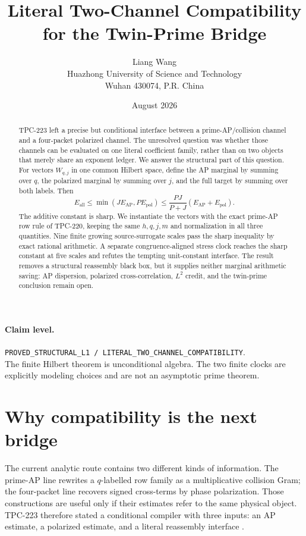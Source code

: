 \documentclass[11pt]{article}
\title{Literal Two-Channel Compatibility for the Twin-Prime Bridge}
\author{Liang Wang\\
  Huazhong University of Science and Technology\\
  Wuhan 430074, P.R. China}
\date{August 2026}
\theoremstyle{remark}
\newcommand{\Eall}{E_{\mathrm{all}}}
\newcommand{\Eap}{E_{\mathrm{AP}}}
\newcommand{\Epol}{E_{\mathrm{pol}}}
\begin{document}
\maketitle

\begin{abstract}
TPC-223 left a precise but conditional interface between a prime-AP/collision
channel and a four-packet polarized channel.  The unresolved question was
whether those channels can be evaluated on one literal coefficient family,
rather than on two objects that merely share an exponent ledger.  We answer
the structural part of this question.  For vectors $W_{q,j}$ in one common
Hilbert space, define the AP marginal by summing over $q$, the polarized
marginal by summing over $j$, and the full target by summing over both labels.
Then
\[
 \Eall\leq \min(J\Eap,P\Epol)
 \leq \frac{PJ}{P+J}(\Eap+\Epol).
\]
The additive constant is sharp.  We instantiate the vectors with the exact
prime-AP row rule of TPC-220, keeping the same $h,q,j,m$ and normalization in
all three quantities.  Nine finite growing source-surrogate scales pass the
sharp inequality by exact rational arithmetic.  A separate congruence-aligned
stress clock reaches the sharp constant at five scales and refutes the tempting
unit-constant interface.  The result removes a structural reassembly black
box, but it supplies neither marginal arithmetic saving: AP dispersion,
polarized cross-correlation, $L^2$ credit, and the twin-prime conclusion remain
open.
\end{abstract}

\paragraph{Claim level.}
\texttt{PROVED\_STRUCTURAL\_L1 / LITERAL\_TWO\_CHANNEL\_COMPATIBILITY}.\\
The finite Hilbert theorem is unconditional algebra.  The two finite clocks
are explicitly modeling choices and are not an asymptotic prime theorem.

\section{Why compatibility is the next bridge}

The current analytic route contains two different kinds of information.  The
prime-AP line rewrites a $q$-labelled row family as a multiplicative collision
Gram; the four-packet line recovers signed cross-terms by phase polarization.
Those constructions are useful only if their estimates refer to the same
physical object.  TPC-223 therefore stated a conditional compiler with three
inputs: an AP estimate, a polarized estimate, and a literal reassembly
interface \cite{tpc220,tpc222,tpc223}.
\end{document}
